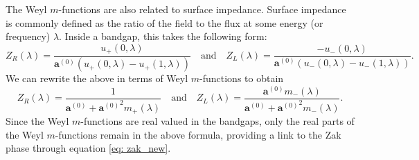 \documentclass[a4paper,reqno,twoside]{amsart}
\numberwithin{equation}{section}
\theoremstyle{definition}
\newcommand{\bseq}[2]{{\bm{#1}^{(#2)}}}
\newcommand{\<}{\ensuremath \leq}
\renewcommand{\>}{\ensuremath \geq}
\renewcommand{\epsilon}{\varepsilon}
\begin{document}
The Weyl $m$-functions are also related to surface impedance. Surface impedance is commonly defined as the ratio of the field to the flux at some energy (or frequency) $\lambda$. Inside a bandgap, this takes the following form:
\begin{equation}
        Z_R(\lambda) = \frac{u_+(0,\lambda)}{\bseq{a}{0}(u_+(0,\lambda) - u_+(1,\lambda))} \quad \text{and}\quad Z_L(\lambda) = \frac{-u_-(0,\lambda)}{\bseq{a}{0}(u_-(0,\lambda) - u_-(1,\lambda))}.
\end{equation}
We can rewrite the above in terms of Weyl $m$-functions to obtain
\begin{equation}
    Z_R(\lambda) =\frac{1}{\bseq{a}{0} + \bseq{a}{0}^2m_+(\lambda)} \quad \text{and} \quad Z_L(\lambda) =\frac{\bseq{a}{0}m_-(\lambda)}{\bseq{a}{0} + \bseq{a}{0}^2m_-(\lambda)}.
\end{equation}
Since the Weyl $m$-functions are real valued in the bandgaps, only the real parts of the Weyl $m$-functions remain in the above formula, providing a link to the Zak phase through equation \eqref{eq: zak_new}.


\end{document}

